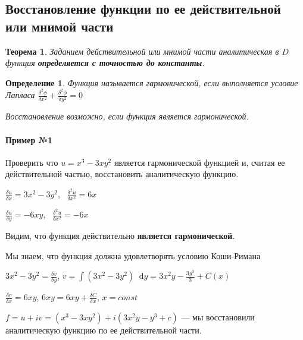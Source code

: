 \documentclass{article}
\newcommand*\diff{\mathop{}\!\mathrm{d}}
\newtheorem{definition}{Определение}
\newtheorem{theorem}{Теорема}
\begin{document}
\subsection{Восстановление функции по ее действительной или мнимой части}

\begin{theorem}
Заданием действительной или мнимой части аналитическая в $D$ функция \textbf{определяется с точностью до константы}.
\end{theorem}

\begin{definition}
Функция называется гармонической, если выполняется условие Лапласа $\frac{\delta^2 \phi}{\delta x^2} + \frac{\delta^2 \phi}{\delta y^2} = 0$

Восстановление возможно, если функция является гармонической.
\end{definition}

\paragraph{Пример №1}

Проверить что $u = x^3 - 3 x y^2$ является гармонической функцией и, считая ее действительной частью, восстановить аналитическую функцию.

\hfill

$\frac{\delta u}{\delta x} = 3 x^2 - 3 y^2$, \ $\frac{\delta^2 u}{\delta x^2} = 6 x$

$\frac{\delta u}{\delta y} = - 6 x y$, \ $\frac{\delta^2 u}{\delta x^2} = -6 x$

Видим, что функция действительно \textbf{является гармонической}.

\hfill

Мы знаем, что функция должна удовлетворять условию Коши-Римана

$3 x^2 - 3 y^2 = \frac{\delta v}{\delta y}$, $v = \int (3 x^2 - 3 y^2) \diff y = 3 x^2 y - \frac{3 y^3}{3} + C (x)$

$\frac{\delta v}{\delta x} = 6 x y$, $6 x y = 6 x y + \frac{\delta C}{\delta x}$, $x = const$

\hfill

$f = u + i v = (x^3 - 3 x y^2) + i (3x^2 y - y^3 + c)$ — мы восстановили аналитическую функцию по ее действительной части.
\end{document}

